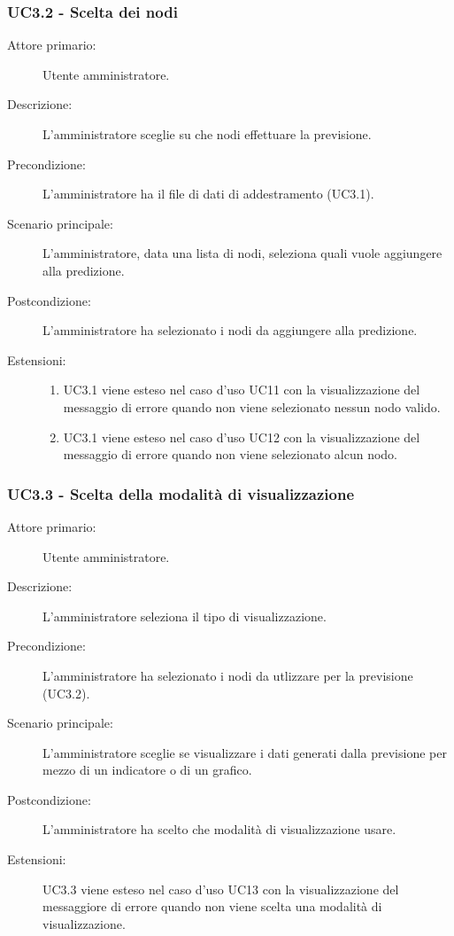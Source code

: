 \subsubsection{UC3.2 - Scelta dei nodi}
\label{sssec:uc3.2}
\begin{description}
  \item[Attore primario:] Utente amministratore.
  \item[Descrizione:] L'amministratore sceglie su che nodi effettuare la previsione.
  \item[Precondizione:] L'amministratore ha il file di dati di addestramento (UC3.1).
  \item[Scenario principale:] L'amministratore, data una lista di nodi, seleziona quali vuole aggiungere alla predizione.
  \item[Postcondizione:] L'amministratore ha selezionato i nodi da aggiungere alla predizione.
  \item[Estensioni:]
  \begin{enumerate}	
	\item UC3.1 viene esteso nel caso d'uso UC11 con la visualizzazione del messaggio di errore quando non viene selezionato nessun nodo valido.
	\item UC3.1 viene esteso nel caso d'uso UC12 con la visualizzazione del messaggio di errore quando non viene selezionato alcun nodo.
  \end{enumerate}
\end{description}

\subsubsection{UC3.3 - Scelta della modalità di visualizzazione}
\label{sssec:uc3.3}
\begin{description}
  \item[Attore primario:] Utente amministratore.
  \item[Descrizione:] L'amministratore seleziona il tipo di visualizzazione.
  \item[Precondizione:]  L'amministratore ha selezionato i nodi da utlizzare per la previsione (UC3.2).
  \item[Scenario principale:] L'amministratore sceglie se visualizzare i dati generati dalla previsione per mezzo di un indicatore o di un grafico.
  \item[Postcondizione:] L'amministratore ha scelto che modalità di visualizzazione usare.
  \item[Estensioni:] UC3.3 viene esteso nel caso d'uso UC13 con la visualizzazione del messaggiore di errore quando non viene scelta una modalità di visualizzazione.
\end{description}

